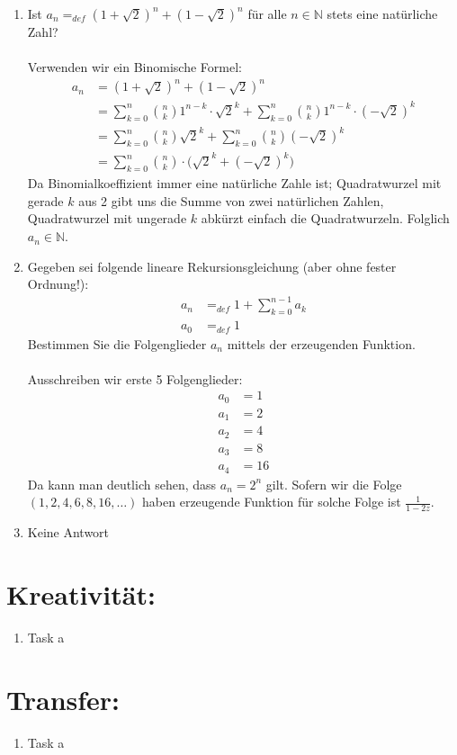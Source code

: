 \begin{enumerate}[label=(\alph*)]
        \item Ist $a_n =_{def} (1+\sqrt 2)^n+(1-\sqrt 2)^n$ für alle $n\in \mathbb{N}$ stets eine natürliche Zahl?\\\\
        Verwenden wir ein Binomische Formel:
        \begin{align*}
            a_n &= (1+\sqrt 2)^n+(1-\sqrt 2)^n \\
            &=\sum_{k=0}^{n} \binom{n}{k} 1^{n-k}\cdot\sqrt{2}^k +
            \sum_{k=0}^{n} \binom{n}{k} 1^{n-k}\cdot(-\sqrt{2})^k \\
            &= \sum_{k=0}^{n} \binom{n}{k}\sqrt{2}^k +
            \sum_{k=0}^{n} \binom{n}{k}(-\sqrt{2})^k \\
            &= \sum_{k=0}^{n} \binom{n}{k}\cdot\big(\sqrt{2}^k + (-\sqrt{2})^k\big)
        \end{align*}
        Da Binomialkoeffizient immer eine natürliche Zahle ist; Quadratwurzel mit gerade $k$ aus 2 
        gibt uns die Summe von zwei natürlichen Zahlen, Quadratwurzel mit ungerade $k$ abkürzt einfach
        die Quadratwurzeln. Folglich $a_n \in \mathbb{N}$.

        \item Gegeben sei folgende lineare Rekursionsgleichung (aber ohne fester Ordnung!):
        \begin{align*}
            a_n &=_{def} 1 + \sum_{k=0}^{n-1} a_k \\
            a_0 &=_{def} 1
        \end{align*}
        Bestimmen Sie die Folgenglieder $a_n$ mittels der erzeugenden Funktion.\\\\
        Ausschreiben wir erste 5 Folgenglieder:
        \begin{align*}
            a_0 &= 1\\
            a_1 &= 2\\
            a_2 &= 4\\
            a_3 &= 8\\
            a_4 &= 16
        \end{align*}
        Da kann man deutlich sehen, dass $a_n = 2^n$ gilt. Sofern wir die Folge $(1,2,4,6,8,16,\ldots)$
        haben erzeugende Funktion für solche Folge ist $\displaystyle\frac{1}{1-2z}$.

        \item Keine Antwort
    \end{enumerate}
    \section*{Kreativität:}
    \begin{enumerate}[label=(\alph*)]
        \item Task a
    \end{enumerate}
    \section*{Transfer:}
    \begin{enumerate}[label=(\alph*)]
        \item Task a
    \end{enumerate}







